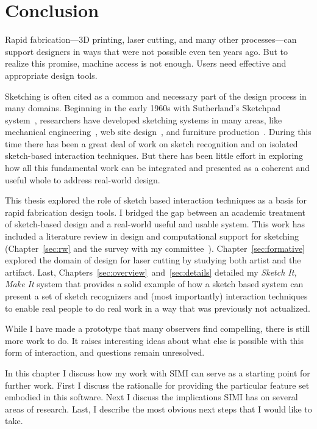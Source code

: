 \chapter{Conclusion}

Rapid fabrication---3D printing, laser cutting, and many other
processes---can support designers in ways that were not possible even
ten years ago. But to realize this promise, machine access is not
enough. Users need effective and appropriate design tools.

Sketching is often cited as a common and necessary part of the design
process in many domains. Beginning in the early 1960s with
Sutherland's Sketchpad system~\cite{sutherland-sketchpad}, researchers
have developed sketching systems in many areas, like mechanical
engineering~\cite{lipson-correlation}, web site
design~\cite{lin-denim}, and furniture
production~\cite{oh-fab,saul-sketch-chair}. During this time there has
been a great deal of work on sketch recognition and on isolated
sketch-based interaction techniques. But there has been little effort
in exploring how all this fundamental work can be integrated and
presented as a coherent and useful whole to address real-world design.

This thesis explored the role of sketch based interaction techniques
as a basis for rapid fabrication design tools. I bridged the gap
between an academic treatment of sketch-based design and a real-world
useful and usable system. This work has included a literature review
in design and computational support for sketching
(Chapter~\ref{sec:rw} and the survey with my
committee~\cite{johnson-sketch-review}). Chapter~\ref{sec:formative}
explored the domain of design for laser cutting by studying both
artist and the artifact. Last,
Chapters~\ref{sec:overview}~and~\ref{sec:details} detailed my
\textit{Sketch It, Make It} system that provides a solid example of
how a sketch based system can present a set of sketch recognizers and
(most importantly) interaction techniques to enable real people to do
real work in a way that was previously not actualized.

While I have made a prototype that many observers find compelling,
there is still more work to do. It raises interesting ideas about what
else is possible with this form of interaction, and questions remain
unresolved.

In this chapter I discuss how my work with SIMI can serve as a
starting point for further work. First I discuss the rationalle for
providing the particular feature set embodied in this software. Next I
discuss the implications SIMI has on several areas of research. Last,
I describe the most obvious next steps that I would like to take.

